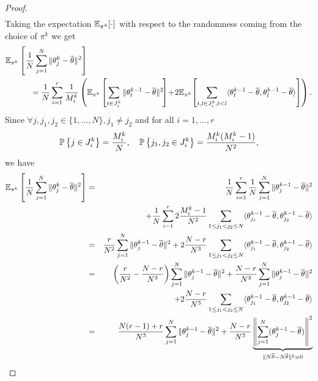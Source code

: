 \begin{proof}
\begin{eqnarray}
\end{eqnarray}
Taking the expectation $\mathbb{E}_{\pi^k}[\cdot]$ with respect to the randomness coming from the choice of $\pi^k$ we get
\begin{eqnarray}
    \EE_{\pi^k}\left[\frac{1}{N}\sum\limits_{j=1}^N\|\theta_j^k - \overline{\theta}\|^2\right] &\notag\\
    &\hspace{-2.5cm}= \frac{1}{N}\sum\limits_{i=1}^r\frac{1}{M_i^k}\left(\EE_{\pi^k}\left[\sum\limits_{t\in J_i^k}\|\theta_t^{k-1} - \overline{\theta}\|^2\!\right] \!+\! 2\EE_{\pi^k}\!\left[\sum\limits_{t,l\in J_i^k, t < l}\langle \theta_t^{k-1} - \overline{\theta}, \theta_l^{k-1} - \overline{\theta} \rangle\right]\right).\notag
\end{eqnarray}
Since $\forall j,j_1,j_2 \in\{1,\ldots,N\},j_1\neq j_2$ and for all $i=1,\ldots,r$
\begin{equation*}
    \mathbb{P}\left\{j\in J_i^k\right\} = \frac{M_i^k}{N},\quad \mathbb{P}\left\{j_1,j_2 \in J_i^k\right\} = \frac{M_{i}^k(M_i^k - 1)}{N^2},
\end{equation*}
we have
\begin{eqnarray*}
    \EE_{\pi^k}\left[\frac{1}{N}\sum\limits_{j=1}^N\|\theta_j^k - \overline{\theta}\|^2\right] &=& \frac{1}{N}\sum\limits_{i=1}^r\frac{1}{N}\sum\limits_{j=1}^N\|\theta_j^{k-1} - \overline{\theta}\|^2\\
    &&\quad +\frac{1}{N}\sum\limits_{i=1}^r2\frac{M_i^k - 1}{N^2}\sum\limits_{1 \le j_1 < j_2 \le N}\langle \theta_{j_1}^{k-1} - \overline{\theta}, \theta_{j_2}^{k-1} - \overline{\theta}\rangle\\
    &=& \frac{r}{N^2}\sum\limits_{j=1}^N\|\theta_j^{k-1} - \overline{\theta}\|^2 + 2\frac{N-r}{N^3}\sum\limits_{1 \le j_1 < j_2 \le N}\langle \theta_{j_1}^{k-1} - \overline{\theta}, \theta_{j_2}^{k-1} - \overline{\theta}\rangle\\
    &=& \left(\frac{r}{N^2} - \frac{N-r}{N^3}\right)\sum\limits_{j=1}^N\|\theta_j^{k-1} - \overline{\theta}\|^2 +\frac{N-r}{N^3}\sum\limits_{j=1}^N\|\theta_j^{k-1} - \overline{\theta}\|^2\\
    &&\quad +2\frac{N-r}{N^3}\sum\limits_{1 \le j_1 < j_2 \le N}\langle \theta_{j_1}^{k-1} - \overline{\theta}, \theta_{j_2}^{k-1} - \overline{\theta}\rangle\\
    &=& \frac{N(r-1)+r}{N^3}\sum\limits_{j=1}^N\|\theta_j^{k-1} - \overline{\theta}\|^2 + \frac{N-r}{N^3}\underbrace{\left\|\sum\limits_{j=1}^N(\theta_j^{k-1} - \overline{\theta})\right\|^2}_{\|N\overline{\theta} - N\overline{\theta}\|^2 = 0}\\

\end{eqnarray*}
\end{proof}
